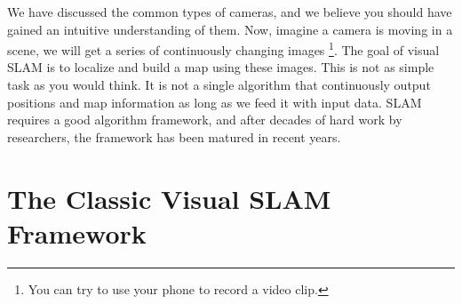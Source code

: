 We have discussed the common types of cameras, and we believe you should have gained an intuitive understanding of them. Now, imagine a camera is moving in a scene, we will get a series of continuously changing images \footnote{You can try to use your phone to record a video clip.}. The goal of visual SLAM is to localize and build a map using these images. This is not as simple task as you would think. It is not a single algorithm that continuously output positions and map information as long as we feed it with input data. SLAM requires a good algorithm framework, and after decades of hard work by researchers, the framework has been matured in recent years.

\section{The Classic Visual SLAM Framework}
%
%
%
%
%
